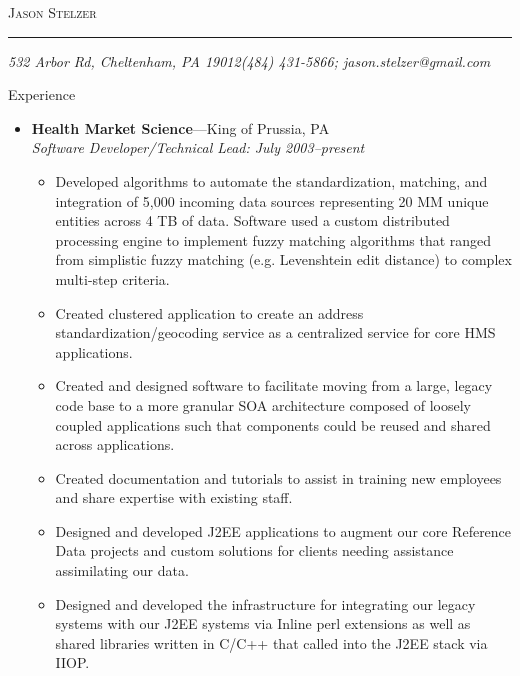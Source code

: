 \documentclass[11pt,oneside]{article}
\makeatletter
\newcommand{\name}{Jason Stelzer}
\newcommand{\addr}{532 Arbor Rd, Cheltenham, PA 19012}
\newcommand{\phone}{(484) 431-5866}
\newcommand{\email}{jason.stelzer@gmail.com}
\newcommand{\bigname}[1]{
	\begin{center}\fontfamily{phv}\selectfont\Huge\scshape#1\end{center}
}
\newenvironment{ressection}[1]{
	\vspace{4pt}
	{\fontfamily{phv}\selectfont\Large#1}
	\begin{itemize}
	\vspace{3pt}
}{
	\end{itemize}
}
\newcommand{\ressubitem}[1]{
	\vspace{-1pt}
	\item \begin{flushleft} #1 \end{flushleft}
}
\newcommand{\resbigitem}[3]{
	\vspace{-5pt}
	\item
	\textbf{#1}---#2 \\
	\textit{#3}
}
\newenvironment{ressubsec}[3]{
	\resbigitem{#1}{#2}{#3}
	\vspace{-2pt}
	\begin{itemize}
}{
	\end{itemize}
}
\makeatother
\begin{document}
 \selectfont

\bigname{\name}

\vspace{-8pt} \rule{\textwidth}{1pt}

\vspace{-1pt} {\small\itshape \addr \hfill \phone; \email}

\vspace{8 pt}




\begin{ressection}{Experience}
	\begin{ressubsec}{Health Market Science}{King of Prussia, PA}{Software Developer/Technical Lead: July 2003--present}

	  \ressubitem{Developed algorithms to automate the
            standardization, matching, and integration of 5,000
            incoming data sources representing 20 MM unique entities
            across 4 TB of data.  Software used a custom distributed
            processing engine to implement fuzzy matching algorithms
            that ranged from simplistic fuzzy matching
            (e.g. Levenshtein edit distance) to complex multi-step
            criteria. }

	  \ressubitem{Created clustered application to create an
            address standardization/geocoding service as a centralized
            service for core HMS applications.}

	  \ressubitem{Created and designed software to facilitate
            moving from a large, legacy code base to a more granular
            SOA architecture composed of loosely coupled applications
            such that components could be reused and shared across
            applications.}

	  \ressubitem{Created documentation and tutorials to assist in
            training new employees and share expertise with existing
            staff.}

	  \ressubitem{Designed and developed J2EE applications to
            augment our core Reference Data projects and custom
            solutions for clients needing assistance assimilating our
            data.}

	  \ressubitem{Designed and developed the infrastructure for
            integrating our legacy systems with our J2EE systems via
            Inline perl extensions as well as shared libraries written
            in C/C++ that called into the J2EE stack via IIOP.}


\end{ressubsec}
\end{ressection}
\end{document}
